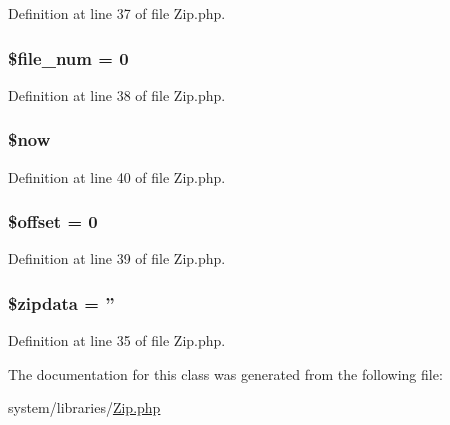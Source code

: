 Definition at line 37 of file Zip.\-php.

\hypertarget{class_c_i___zip_af1ab53ee1a849492829ce782aac0163d}{
\subsubsection[{\$file\-\_\-num}]{\setlength{\rightskip}{0pt plus 5cm}\$file\-\_\-num = 0}}\label{class_c_i___zip_af1ab53ee1a849492829ce782aac0163d}


Definition at line 38 of file Zip.\-php.

\hypertarget{class_c_i___zip_af1d5ccdee975b8f4d20aaffc5b28557c}{
\subsubsection[{\$now}]{\setlength{\rightskip}{0pt plus 5cm}\$now}}\label{class_c_i___zip_af1d5ccdee975b8f4d20aaffc5b28557c}


Definition at line 40 of file Zip.\-php.

\hypertarget{class_c_i___zip_aec4de82415d7f05cb9748d12d3a95a87}{
\subsubsection[{\$offset}]{\setlength{\rightskip}{0pt plus 5cm}\$offset = 0}}\label{class_c_i___zip_aec4de82415d7f05cb9748d12d3a95a87}


Definition at line 39 of file Zip.\-php.

\hypertarget{class_c_i___zip_a395accfd5884d9a0e6fd53470b3e85b1}{
\subsubsection[{\$zipdata}]{\setlength{\rightskip}{0pt plus 5cm}\$zipdata = ''}}\label{class_c_i___zip_a395accfd5884d9a0e6fd53470b3e85b1}


Definition at line 35 of file Zip.\-php.



The documentation for this class was generated from the following file\-:\begin{DoxyCompactItemize}
\item 
system/libraries/\hyperlink{_zip_8php}{Zip.\-php}\end{DoxyCompactItemize}
